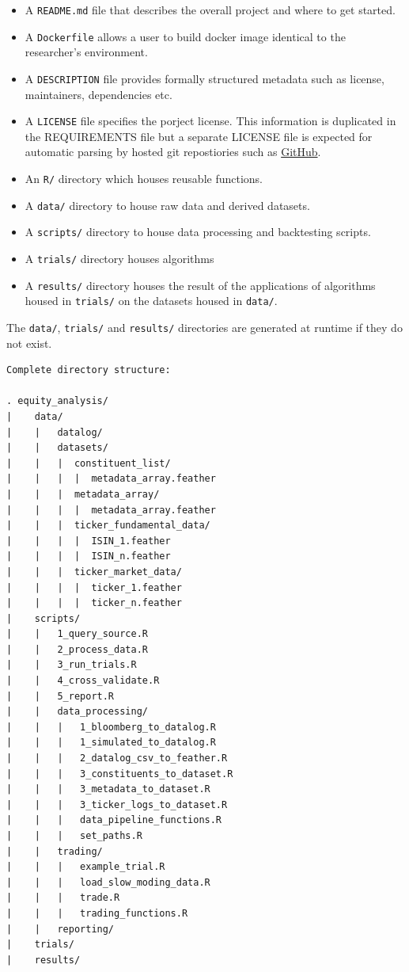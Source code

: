 \documentclass[11pt,preprint, authoryear]{elsarticle}
\numberwithin{equation}{section}
\numberwithin{figure}{section}
\numberwithin{table}{section}
\def\tightlist{} %
\begin{document}
\begin{itemize}
\tightlist
\item
  A \texttt{README.md} file that describes the overall project and where
  to get started.
\item
  A \texttt{Dockerfile} allows a user to build docker image identical to
  the researcher's environment.
\item
  A \texttt{DESCRIPTION} file provides formally structured metadata such
  as license, maintainers, dependencies etc.
\item
  A \texttt{LICENSE} file specifies the porject license. This
  information is duplicated in the REQUIREMENTS file but a separate
  LICENSE file is expected for automatic parsing by hosted git
  repostiories such as \href{https://github.com}{GitHub}.
\item
  An \texttt{R/} directory which houses reusable functions.
\item
  A \texttt{data/} directory to house raw data and derived datasets.
\item
  A \texttt{scripts/} directory to house data processing and backtesting
  scripts.
\item
  A \texttt{trials/} directory houses algorithms
\item
  A \texttt{results/} directory houses the result of the applications of
  algorithms housed in \texttt{trials/} on the datasets housed in
  \texttt{data/}.
\end{itemize}

The \texttt{data/}, \texttt{trials/} and \texttt{results/} directories
are generated at runtime if they do not exist.

\newpage

\begin{verbatim}
Complete directory structure: 

. equity_analysis/
|    data/
|    |   datalog/
|    |   datasets/
|    |   |  constituent_list/
|    |   |  |  metadata_array.feather
|    |   |  metadata_array/
|    |   |  |  metadata_array.feather
|    |   |  ticker_fundamental_data/
|    |   |  |  ISIN_1.feather
|    |   |  |  ISIN_n.feather
|    |   |  ticker_market_data/
|    |   |  |  ticker_1.feather
|    |   |  |  ticker_n.feather
|    scripts/
|    |   1_query_source.R
|    |   2_process_data.R
|    |   3_run_trials.R
|    |   4_cross_validate.R
|    |   5_report.R
|    |   data_processing/
|    |   |   1_bloomberg_to_datalog.R
|    |   |   1_simulated_to_datalog.R
|    |   |   2_datalog_csv_to_feather.R
|    |   |   3_constituents_to_dataset.R
|    |   |   3_metadata_to_dataset.R
|    |   |   3_ticker_logs_to_dataset.R
|    |   |   data_pipeline_functions.R
|    |   |   set_paths.R
|    |   trading/
|    |   |   example_trial.R
|    |   |   load_slow_moding_data.R
|    |   |   trade.R
|    |   |   trading_functions.R
|    |   reporting/
|    trials/
|    results/
\end{verbatim}
\end{document}

